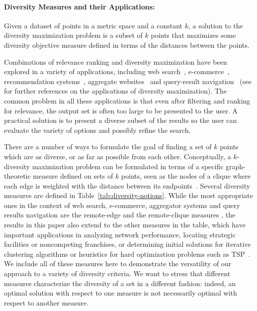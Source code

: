 \documentclass{article}
\begin{document}
\paragraph{Diversity Measures and their Applications:}
Given a dataset of
points in a metric space and a constant $k$, a solution to the
diversity maximization problem is a subset of $k$ points that
maximizes some diversity objective measure defined in terms of the
distances between the points.

Combinations of relevance ranking and diversity maximization have been
explored in a variety of applications, including web
search~\cite{AngelK11}, e-commerce~\cite{BhattacharyaGM11},
recommendation systems~\cite{YuLA09}, aggregate
websites~\cite{MunsonZR09} and query-result navigation~\cite{ChenL07} (see
\cite{RosenkrantzRT07,AbbassiMT13,IndykMMM14} for further references on the
applications of diversity maximization).  The common problem in all
these applications is that even after filtering and ranking for
relevance, the output set is often too large to be presented to the
user. A practical solution is to present a diverse subset of the
results so the user can evaluate the variety of options and possibly
refine the search.

There are a number of ways to formulate the goal of finding a set of
$k$ points which are as diverse, or as far as possible from each
other. Conceptually, a $k$-diversity maximization problem can be
formulated in terms of a specific graph-theoretic measure defined on
sets of $k$ points, seen as the nodes of a clique where each edge is
weighted with the distance between its endpoints~\cite{ChandraH01}.
Several diversity measures are defined in
Table~\ref{tab:diversity-notions}.  While the most appropriate ones in
the context of web search, e-commerce, aggregator systems and query results
navigation are the remote-edge and the remote-clique measures
\cite{GollapudiS09,AbbassiMT13}, the results in this paper also extend
to the other measures in the table, which have important applications
in analyzing network performance, locating strategic facilities or
noncompeting franchises, or determining initial solutions for
iterative clustering algorithms or heuristics for hard optimization
problems such as
TSP~\cite{HalldorssonIKT99,ChandraH01,RosenkrantzRT07}. We include all
of these measures here to demonstrate the versatility of our approach
to a variety of diversity criteria. We want to stress that different
measures characterize the diversity of a set in a different fashion:
indeed, an optimal solution with respect to one measure is not
necessarily optimal with respect to another measure.
\end{document}
